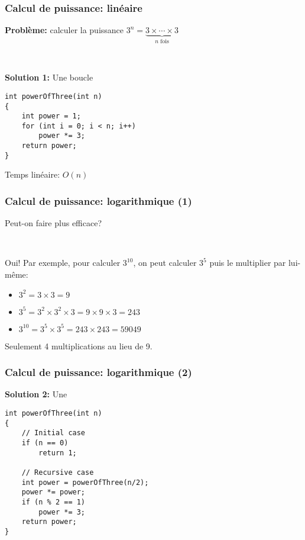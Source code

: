 
\begin{frame}[fragile]
\frametitle{Calcul de puissance: linéaire}
\textbf{Problème:} calculer la puissance $3^n = \underbrace{3\times\cdots\times3}_\text{$n$ fois}$

~

\textbf{Solution 1:} Une boucle
\begin{lstlisting}[frame=single]
int powerOfThree(int n)
{
    int power = 1;
    for (int i = 0; i < n; i++)
        power *= 3;
    return power;
}
\end{lstlisting}
Temps linéaire: $O(n)$
\end{frame}

\begin{frame}
\frametitle{Calcul de puissance: logarithmique (1)}
Peut-on faire plus efficace?

~

Oui! Par exemple, pour calculer $3^{10}$, on peut calculer $3^5$ puis le multiplier par lui-même:
\begin{itemize}
\item $3^2 = 3 \times 3 = 9$
\item $3^5 = 3^2 \times 3^2 \times 3 = 9 \times 9 \times 3 = 243$
\item $3^{10} = 3^5 \times 3^5 = 243 \times 243 = 59049$
\end{itemize}
Seulement 4 multiplications au lieu de 9.
\end{frame}

\begin{frame}[fragile]
\frametitle{Calcul de puissance: logarithmique (2)}
\textbf{Solution 2:} Une 
\begin{lstlisting}[frame=single]
int powerOfThree(int n)
{
    // Initial case
    if (n == 0)
        return 1;
    
    // Recursive case
    int power = powerOfThree(n/2);
    power *= power;
    if (n % 2 == 1)
        power *= 3;
    return power;
}
\end{lstlisting}
\end{frame}
